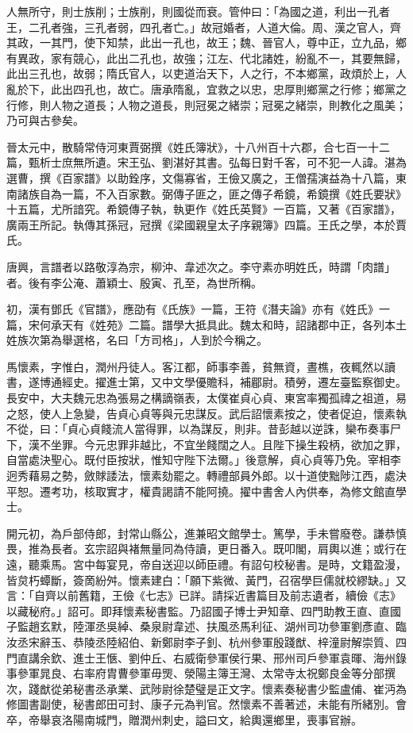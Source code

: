 \begin{pinyinscope}
 人無所守，則士族削；士族削，則國從而衰。管仲曰：「為國之道，利出一孔者王，二孔者強，三孔者弱，四孔者亡。」故冠婚者，人道大倫。周、漢之官人，齊其政，一其門，使下知禁，此出一孔也，故王；魏、晉官人，尊中正，立九品，鄉有異政，家有競心，此出二孔也，故強；江左、代北諸姓，紛亂不一，其要無歸，此出三孔也，故弱；隋氏官人，以吏道治天下，人之行，不本鄉黨，政煩於上，人亂於下，此出四孔也，故亡。唐承隋亂，宜救之以忠，忠厚則鄉黨之行修；鄉黨之行修，則人物之道長；人物之道長，則冠冕之緒崇；冠冕之緒崇，則教化之風美；乃可與古參矣。



 晉太元中，散騎常侍河東賈弼撰《姓氏簿狀》，十八州百十六郡，合七百一十二篇，甄析士庶無所遺。宋王弘、劉湛好其書。弘每日對千客，可不犯一人諱。湛為選曹，撰《百家譜》以助銓序，文傷寡省，王儉又廣之，王僧孺演益為十八篇，東南諸族自為一篇，不入百家數。弼傳子匪之，匪之傳子希鏡，希鏡撰《姓氏要狀》十五篇，尤所諳究。希鏡傳子執，執更作《姓氏英賢》一百篇，又著《百家譜》，廣兩王所記。執傳其孫冠，冠撰《梁國親皇太子序親簿》四篇。王氏之學，本於賈氏。



 唐興，言譜者以路敬淳為宗，柳沖、韋述次之。李守素亦明姓氏，時謂「肉譜」者。後有李公淹、蕭穎士、殷寅、孔至，為世所稱。



 初，漢有鄧氏《官譜》，應劭有《氏族》一篇，王符《潛夫論》亦有《姓氏》一篇，宋何承天有《姓苑》二篇。譜學大抵具此。魏太和時，詔諸郡中正，各列本土姓族次第為舉選格，名曰「方司格」，人到於今稱之。



 馬懷素，字惟白，潤州丹徒人。客江都，師事李善，貧無資，晝樵，夜輒然以讀書，遂博通經史。擢進士第，又中文學優贍科，補郿尉。積勞，遷左臺監察御史。長安中，大夫魏元忠為張易之構謫嶺表，太僕崔貞心貞、東宮率獨孤禕之祖道，易之怒，使人上急變，告貞心貞等與元忠謀反。武后詔懷素按之，使者促迫，懷素執不從，曰：「貞心貞餞流人當得罪，以為謀反，則非。昔彭越以逆誅，欒布奏事尸下，漢不坐罪。今元忠罪非越比，不宜坐餞闊之人。且陛下操生殺柄，欲加之罪，自當處決聖心。既付臣按狀，惟知守陛下法爾。」後意解，貞心貞等乃免。宰相李迥秀藉易之勢，斂賕諉法，懷素劾罷之。轉禮部員外郎。以十道使黜陟江西，處決平恕。遷考功，核取實才，權貴謁請不能阿撓。擢中書舍人內供奉，為修文館直學士。



 開元初，為戶部侍郎，封常山縣公，進兼昭文館學士。篤學，手未嘗廢卷。謙恭慎畏，推為長者。玄宗詔與褚無量同為侍讀，更日番入。既叩閣，肩輿以進；或行在遠，聽乘馬。宮中每宴見，帝自送迎以師臣禮。有詔句校秘書。是時，文籍盈漫，皆炱朽蟫斷，簽啇紛舛。懷素建白：「願下紫微、黃門，召宿學巨儒就校繆缺。」又言：「自齊以前舊籍，王儉《七志》已詳。請採近書篇目及前志遺者，續儉《志》以藏秘府。」詔可。即拜懷素秘書監。乃詔國子博士尹知章、四門助教王直、直國子監趙玄默，陸渾丞吳綽、桑泉尉韋述、扶風丞馬利征、湖州司功參軍劉彥直、臨汝丞宋辭玉、恭陵丞陸紹伯、新鄭尉李子釗、杭州參軍殷踐猷、梓潼尉解崇質、四門直講余欽、進士王愜、劉仲丘、右威衛參軍侯行果、邢州司戶參軍袁暉、海州錄事參軍晁良、右率府胄曹參軍毋煚、滎陽主簿王灣、太常寺太祝鄭良金等分部撰次，踐猷從弟秘書丞承業、武陟尉徐楚璧是正文字。懷素奏秘書少監盧俌、崔沔為修圖書副使，秘書郎田可封、康子元為判官。然懷素不善著述，未能有所緒別。會卒，帝舉哀洛陽南城門，贈潤州刺史，謚曰文，給輿還鄉里，喪事官辦。




\end{pinyinscope}
